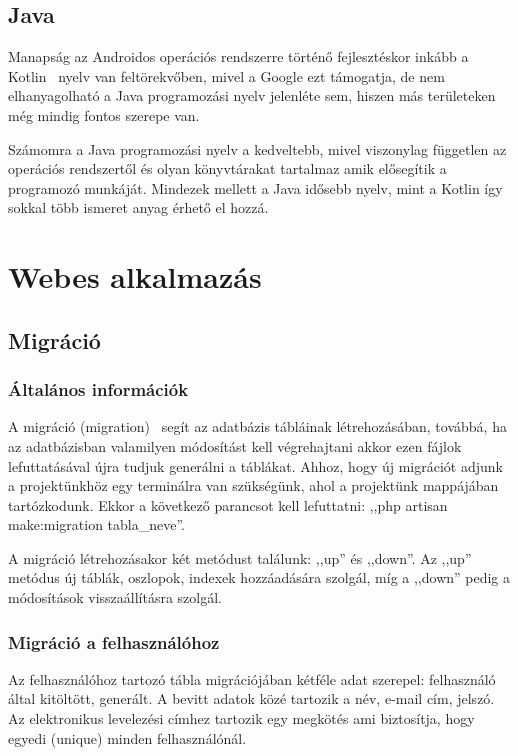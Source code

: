 \documentclass[
]{thesis-ekf}
\theoremstyle{definition}
\theoremstyle{remark}
\begin{document}
	\section{Java}
	Manapság az Androidos operációs rendszerre történő fejlesztéskor inkább a Kotlin~\cite{kotlin_book} nyelv van feltörekvőben, mivel a Google ezt támogatja, de nem elhanyagolható a Java programozási nyelv jelenléte sem, hiszen más területeken még mindig fontos szerepe van. 
	
	Számomra a Java programozási nyelv a kedveltebb, mivel viszonylag független az operációs rendszertől és olyan könyvtárakat tartalmaz amik elősegítik a programozó munkáját. Mindezek mellett a Java idősebb nyelv, mint a Kotlin így sokkal több ismeret anyag érhető el hozzá.
	
	\chapter{Webes alkalmazás}
	\section{Migráció}
	\subsection{Általános információk}
	A migráció (migration)~\cite{laravel_migartion} segít az adatbázis tábláinak létrehozásában, továbbá, ha az adatbázisban valamilyen módosítást kell végrehajtani akkor ezen fájlok lefuttatásával újra tudjuk generálni a táblákat. Ahhoz, hogy új migrációt adjunk a projektünkhöz egy terminálra van szükségünk, ahol a projektünk mappájában tartózkodunk. Ekkor a következő parancsot kell lefuttatni: ,,php artisan make:migration tabla\_neve''.
	
	A migráció létrehozásakor két metódust találunk: ,,up'' és ,,down''. Az ,,up'' metódus új táblák, oszlopok, indexek hozzáadására szolgál, míg a ,,down'' pedig a módosítások visszaállításra szolgál. 
	
	\subsection{Migráció a felhasználóhoz}
	Az felhasználóhoz tartozó tábla migrációjában kétféle adat szerepel: felhasználó által kitöltött, generált. A bevitt adatok közé tartozik a név, e-mail cím, jelszó. Az elektronikus levelezési címhez tartozik egy megkötés ami biztosítja, hogy egyedi (unique) minden felhasználónál. 
	
\end{document}
